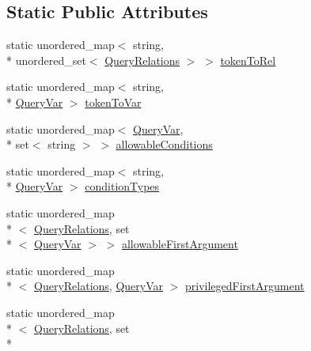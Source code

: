 \subsection*{Static Public Attributes}
\begin{DoxyCompactItemize}
\item 
static unordered\-\_\-map$<$ string, \\*
unordered\-\_\-set$<$ \hyperlink{class_rules_of_engagement_a5e08db2a0638b98dbb06ad923a33d817}{Query\-Relations} $>$ $>$ \hyperlink{class_rules_of_engagement_ae9b3fd791855b69fdf746d47df2b2bdd}{token\-To\-Rel}
\item 
static unordered\-\_\-map$<$ string, \\*
\hyperlink{class_rules_of_engagement_a5dd2b28fd0c906d9b08e29e371713ead}{Query\-Var} $>$ \hyperlink{class_rules_of_engagement_ab3e59955494f404502bf165417df74c9}{token\-To\-Var}
\item 
static unordered\-\_\-map$<$ \hyperlink{class_rules_of_engagement_a5dd2b28fd0c906d9b08e29e371713ead}{Query\-Var}, \\*
set$<$ string $>$ $>$ \hyperlink{class_rules_of_engagement_af8095e34ef7cd49343e8d2dfd1f47e3e}{allowable\-Conditions}
\item 
static unordered\-\_\-map$<$ string, \\*
\hyperlink{class_rules_of_engagement_a5dd2b28fd0c906d9b08e29e371713ead}{Query\-Var} $>$ \hyperlink{class_rules_of_engagement_a5f44ebe9fe8019b6415272f410673755}{condition\-Types}
\item 
static unordered\-\_\-map\\*
$<$ \hyperlink{class_rules_of_engagement_a5e08db2a0638b98dbb06ad923a33d817}{Query\-Relations}, set\\*
$<$ \hyperlink{class_rules_of_engagement_a5dd2b28fd0c906d9b08e29e371713ead}{Query\-Var} $>$ $>$ \hyperlink{class_rules_of_engagement_a0a16b8602e2522f007f54f157a0f1203}{allowable\-First\-Argument}
\item 
static unordered\-\_\-map\\*
$<$ \hyperlink{class_rules_of_engagement_a5e08db2a0638b98dbb06ad923a33d817}{Query\-Relations}, \hyperlink{class_rules_of_engagement_a5dd2b28fd0c906d9b08e29e371713ead}{Query\-Var} $>$ \hyperlink{class_rules_of_engagement_a7dd292534cee25afe99b1187a6e07774}{privileged\-First\-Argument}
\item 
static unordered\-\_\-map\\*
$<$ \hyperlink{class_rules_of_engagement_a5e08db2a0638b98dbb06ad923a33d817}{Query\-Relations}, set\\*

\end{DoxyCompactItemize}
